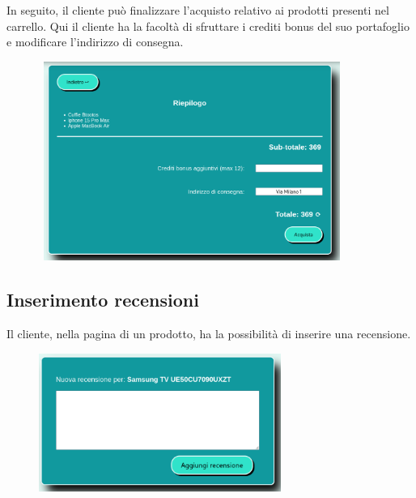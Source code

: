 \documentclass[a4paper, 14pt]{article}
\begin{document}
\begin{flushleft}
				In seguito, il cliente può finalizzare l'acquisto relativo ai prodotti presenti nel carrello.
				Qui il cliente ha la facoltà di sfruttare i crediti bonus del suo portafoglio e modificare l'indirizzo di consegna.
				\begin{figure}[H]
					\centering
					\includegraphics[width=10cm, height=6.5cm, frame=2pt]{"screenFinalizzaAcquisto.png"}	
				\end{figure}
			
			\subsection{Inserimento recensioni}
				Il cliente, nella pagina di un prodotto, ha la possibilità di inserire una recensione.
				\begin{figure}[H]
					\centering
					\includegraphics[height=4.5cm, frame=2pt]{"screenRecensioni.png"}	
				\end{figure}
			

\end{flushleft}
\end{document}
